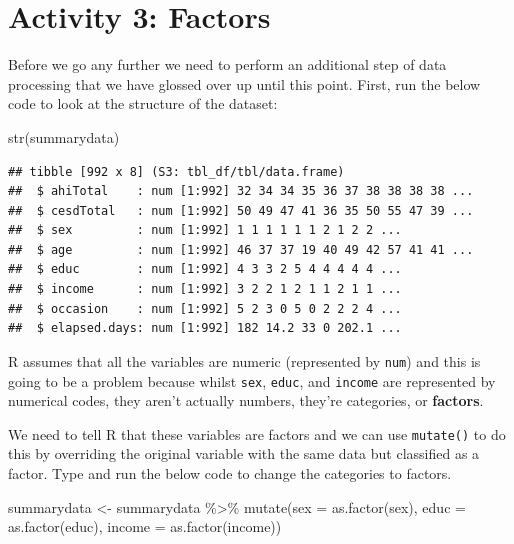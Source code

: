 \documentclass[
  oneside]{book}
\newenvironment{Shaded}{\begin{snugshade}}{\end{snugshade}}
\newcommand{\AttributeTok}[1]{\textcolor[rgb]{0.77,0.63,0.00}{#1}}
\newcommand{\FunctionTok}[1]{\textcolor[rgb]{0.00,0.00,0.00}{#1}}
\newcommand{\NormalTok}[1]{#1}
\newcommand{\OtherTok}[1]{\textcolor[rgb]{0.56,0.35,0.01}{#1}}
\newcommand{\SpecialCharTok}[1]{\textcolor[rgb]{0.00,0.00,0.00}{#1}}
\begin{document}
\hypertarget{activity-3-factors}{%
\section{Activity 3: Factors}\label{activity-3-factors}}

Before we go any further we need to perform an additional step of data processing that we have glossed over up until this point. First, run the below code to look at the structure of the dataset:

\begin{Shaded}
\begin{Highlighting}[]
\FunctionTok{str}\NormalTok{(summarydata)}
\end{Highlighting}
\end{Shaded}

\begin{verbatim}
## tibble [992 x 8] (S3: tbl_df/tbl/data.frame)
##  $ ahiTotal    : num [1:992] 32 34 34 35 36 37 38 38 38 38 ...
##  $ cesdTotal   : num [1:992] 50 49 47 41 36 35 50 55 47 39 ...
##  $ sex         : num [1:992] 1 1 1 1 1 1 2 1 2 2 ...
##  $ age         : num [1:992] 46 37 37 19 40 49 42 57 41 41 ...
##  $ educ        : num [1:992] 4 3 3 2 5 4 4 4 4 4 ...
##  $ income      : num [1:992] 3 2 2 1 2 1 1 2 1 1 ...
##  $ occasion    : num [1:992] 5 2 3 0 5 0 2 2 2 4 ...
##  $ elapsed.days: num [1:992] 182 14.2 33 0 202.1 ...
\end{verbatim}

R assumes that all the variables are numeric (represented by \texttt{num}) and this is going to be a problem because whilst \texttt{sex}, \texttt{educ}, and \texttt{income} are represented by numerical codes, they aren't actually numbers, they're categories, or \textbf{factors}.

We need to tell R that these variables are factors and we can use \texttt{mutate()} to do this by overriding the original variable with the same data but classified as a factor. Type and run the below code to change the categories to factors.

\begin{Shaded}
\begin{Highlighting}[]
\NormalTok{summarydata }\OtherTok{\textless{}{-}}\NormalTok{ summarydata }\SpecialCharTok{\%\textgreater{}\%}
  \FunctionTok{mutate}\NormalTok{(}\AttributeTok{sex =} \FunctionTok{as.factor}\NormalTok{(sex),}
         \AttributeTok{educ =} \FunctionTok{as.factor}\NormalTok{(educ),}
         \AttributeTok{income =} \FunctionTok{as.factor}\NormalTok{(income))}
\end{Highlighting}
\end{Shaded}
\end{document}
